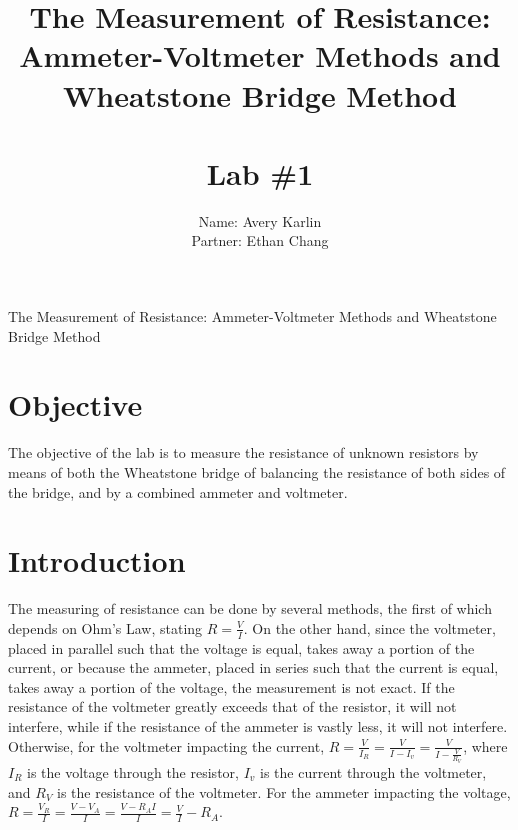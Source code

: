 \documentclass[11pt, titlepage]{article}
\title{The Measurement of Resistance: Ammeter-Voltmeter Methods and Wheatstone Bridge Method \\ \ \\ \large Lab \#1}
\author{Name: Avery Karlin \\ Partner: Ethan Chang}
\date{}
\begin{document}
\maketitle

\begin{center}
\LARGE The Measurement of Resistance: Ammeter-Voltmeter Methods and Wheatstone Bridge Method
\end{center}

\section*{Objective}
The objective of the lab is to measure the resistance of unknown resistors by means of both the Wheatstone bridge of balancing the resistance of both sides of the bridge, and by a combined ammeter and voltmeter.

\section*{Introduction}
The measuring of resistance can be done by several methods, the first of which depends on Ohm's Law, stating $R = \frac{V}{I}$. On the other hand, since the voltmeter, placed in parallel such that the voltage is equal, takes away a portion of the current, or because the ammeter, placed in series such that the current is equal, takes away a portion of the voltage, the measurement is not exact. If the resistance of the voltmeter greatly exceeds that of the resistor, it will not interfere, while if the resistance of the ammeter is vastly less, it will not interfere. Otherwise, for the voltmeter impacting the current, $R = \frac{V}{I_R} = \frac{V}{I - I_v} = \frac{V}{I - \frac{V}{R_V}}$, where $I_R$ is the voltage through the resistor, $I_v$ is the current through the voltmeter, and $R_V$ is the resistance of the voltmeter. For the ammeter impacting the voltage, $R = \frac{V_R}{I} = \frac{V - V_A}{I} = \frac{V - R_AI}{I} = \frac{V}{I} - R_A$.
\end{document}
